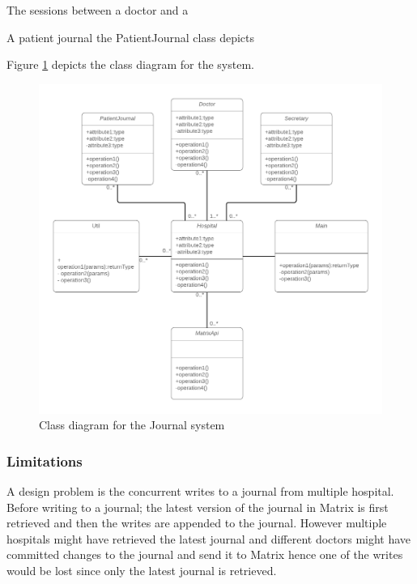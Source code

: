  
 
The sessions between a doctor and a 

A patient journal the PatientJournal class depicts 

Figure \ref{fig:journalsystem} depicts the class diagram for the system.



\begin{figure}[H] 
	\hspace*{-1.3cm}
	\centering
	\includegraphics[width=14cm]{figures/journalsystem_class.png}
	\caption{Class diagram for the Journal system}
	\label{fig:journalsystem}
\end{figure}





\subsubsection{Limitations}



A design problem is the concurrent writes to a journal from multiple hospital. Before writing to a journal; the latest version of the journal in Matrix is first retrieved and then the writes are appended to the journal. However multiple hospitals might have retrieved the latest journal and different doctors might have committed changes to the journal and send it to Matrix hence one of the writes would be lost since only the latest journal is retrieved. 

